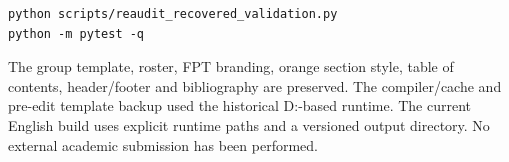 \begin{verbatim}
python scripts/reaudit_recovered_validation.py
python -m pytest -q
\end{verbatim}
The group template, roster, FPT branding, orange section style, table of contents,
header/footer and bibliography are preserved. The compiler/cache and pre-edit
template backup used the historical D:-based runtime. The current English build
uses explicit runtime paths and a versioned output directory. No external
academic submission has been performed.
